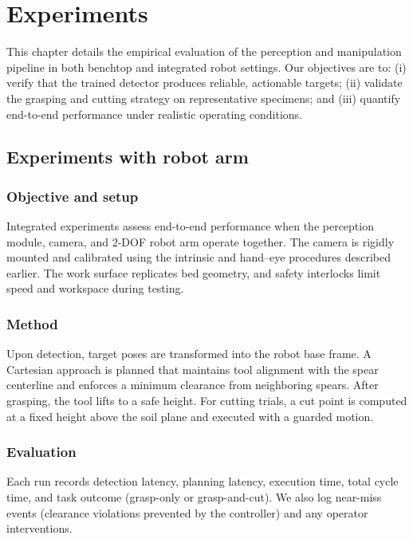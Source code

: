 \chapter{Experiments}
This chapter details the empirical evaluation of the perception and manipulation pipeline in both benchtop and integrated robot settings. 
Our objectives are to: (i) verify that the trained detector produces reliable, actionable targets; (ii) validate the grasping and 
cutting strategy on representative specimens; and (iii) quantify end-to-end performance under realistic operating conditions.






\section{Experiments with robot arm}
\subsection*{Objective and setup}
Integrated experiments assess end-to-end performance when the perception module, camera, and 2-DOF robot arm operate together. The camera 
is rigidly mounted and calibrated using the intrinsic and hand--eye procedures described earlier. The work surface replicates bed geometry, 
and safety interlocks limit speed and workspace during testing.

\subsection*{Method}
Upon detection, target poses are transformed into the robot base frame. A Cartesian approach is planned that maintains tool alignment 
with the spear centerline and enforces a minimum clearance from neighboring spears. After grasping, the tool lifts to a safe height. 
For cutting trials, a cut point is computed at a fixed height above the soil plane and executed with a guarded motion.

\subsection*{Evaluation}
Each run records detection latency, planning latency, execution time, total cycle time, and task outcome (grasp-only or grasp-and-cut). 
We also log near-miss events (clearance violations prevented by the controller) and any operator interventions.

